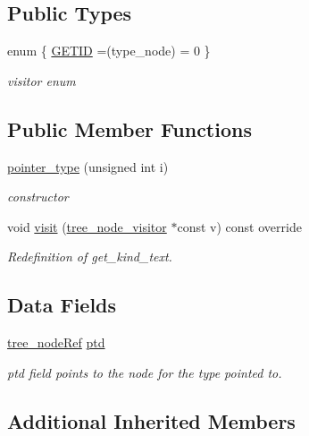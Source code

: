 \subsection*{Public Types}
\begin{DoxyCompactItemize}
\item 
enum \{ \hyperlink{structpointer__type_a0c5f8c797ca1e9251bde1388c9282c6cadea036a527e6586a9841c454a91907d1}{G\+E\+T\+ID} =(type\+\_\+node) = 0
 \}\begin{DoxyCompactList}\small\item\em visitor enum \end{DoxyCompactList}
\end{DoxyCompactItemize}
\subsection*{Public Member Functions}
\begin{DoxyCompactItemize}
\item 
\hyperlink{structpointer__type_a52e0ef3a51504f4faee3454bbdf41c89}{pointer\+\_\+type} (unsigned int i)
\begin{DoxyCompactList}\small\item\em constructor \end{DoxyCompactList}\item 
void \hyperlink{structpointer__type_aa2f2890548ddc7599a180a59c1635c93}{visit} (\hyperlink{classtree__node__visitor}{tree\+\_\+node\+\_\+visitor} $\ast$const v) const override
\begin{DoxyCompactList}\small\item\em Redefinition of get\+\_\+kind\+\_\+text. \end{DoxyCompactList}\end{DoxyCompactItemize}
\subsection*{Data Fields}
\begin{DoxyCompactItemize}
\item 
\hyperlink{tree__node_8hpp_a6ee377554d1c4871ad66a337eaa67fd5}{tree\+\_\+node\+Ref} \hyperlink{structpointer__type_aa4c2e5f89dde51339a5bdb61396312b1}{ptd}
\begin{DoxyCompactList}\small\item\em ptd field points to the node for the type pointed to. \end{DoxyCompactList}\end{DoxyCompactItemize}
\subsection*{Additional Inherited Members}


